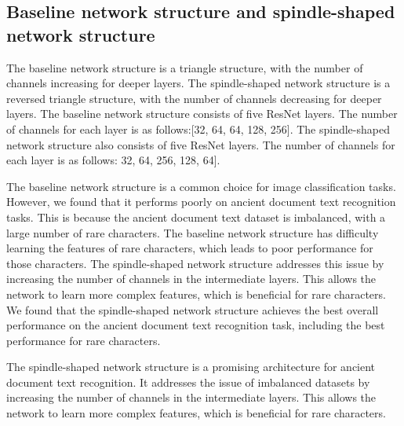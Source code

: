 \subsection{Baseline network structure and spindle-shaped network structure}

The baseline network structure is a triangle structure, with the number of channels increasing for deeper layers. The spindle-shaped network structure is a reversed triangle structure, with the number of channels decreasing for deeper layers.
The baseline network structure consists of five ResNet layers. The number of channels for each layer is as follows:[32, 64, 64, 128, 256].
The spindle-shaped network structure also consists of five ResNet layers. The number of channels for each layer is as follows: 32, 64, 256, 128, 64]. 

The baseline network structure is a common choice for image classification tasks. However, we found that it performs poorly on ancient document text recognition tasks. This is because the ancient document text dataset is imbalanced, with a large number of rare characters. The baseline network structure has difficulty learning the features of rare characters, which leads to poor performance for those characters. The spindle-shaped network structure addresses this issue by increasing the number of channels in the intermediate layers. This allows the network to learn more complex features, which is beneficial for rare characters. We found that the spindle-shaped network structure achieves the best overall performance on the ancient document text recognition task, including the best performance for rare characters.

The spindle-shaped network structure is a promising architecture for ancient document text recognition. It addresses the issue of imbalanced datasets by increasing the number of channels in the intermediate layers. This allows the network to learn more complex features, which is beneficial for rare characters.
